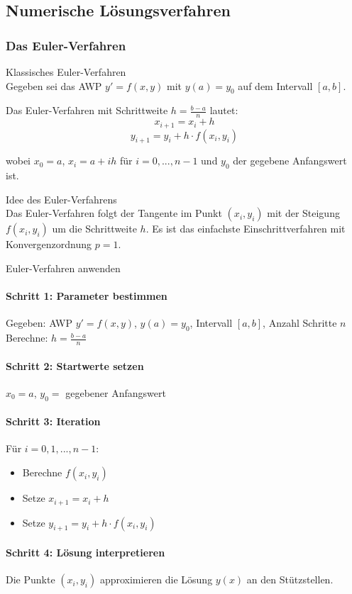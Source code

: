 \raggedcolumns
\pagebreak

\subsection{Numerische Lösungsverfahren}

\subsubsection{Das Euler-Verfahren}

\begin{theorem}{Klassisches Euler-Verfahren}\\
Gegeben sei das AWP $y' = f(x,y)$ mit $y(a) = y_0$ auf dem Intervall $[a,b]$.

Das Euler-Verfahren mit Schrittweite $h = \frac{b-a}{n}$ lautet:
$$x_{i+1} = x_i + h$$
$$y_{i+1} = y_i + h \cdot f(x_i, y_i)$$

wobei $x_0 = a$, $x_i = a + ih$ für $i = 0, ..., n-1$ und $y_0$ der gegebene Anfangswert ist.
\end{theorem}

\begin{concept}{Idee des Euler-Verfahrens}\\
Das Euler-Verfahren folgt der Tangente im Punkt $(x_i, y_i)$ mit der Steigung $f(x_i, y_i)$ um die Schrittweite $h$. Es ist das einfachste Einschrittverfahren mit Konvergenzordnung $p = 1$.
\end{concept}

\begin{KR}{Euler-Verfahren anwenden}
\paragraph{Schritt 1: Parameter bestimmen}
Gegeben: AWP $y' = f(x,y)$, $y(a) = y_0$, Intervall $[a,b]$, Anzahl Schritte $n$
Berechne: $h = \frac{b-a}{n}$

\paragraph{Schritt 2: Startwerte setzen}
$x_0 = a$, $y_0 = $ gegebener Anfangswert

\paragraph{Schritt 3: Iteration}
Für $i = 0, 1, ..., n-1$:
\begin{itemize}
    \item Berechne $f(x_i, y_i)$
    \item Setze $x_{i+1} = x_i + h$
    \item Setze $y_{i+1} = y_i + h \cdot f(x_i, y_i)$
\end{itemize}

\paragraph{Schritt 4: Lösung interpretieren}
Die Punkte $(x_i, y_i)$ approximieren die Lösung $y(x)$ an den Stützstellen.
\end{KR}

